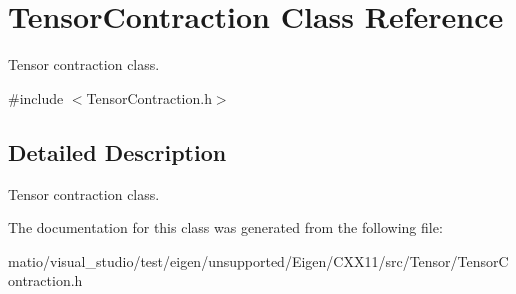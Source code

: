 \hypertarget{class_tensor_contraction}{}\section{Tensor\+Contraction Class Reference}
\label{class_tensor_contraction}


Tensor contraction class.  




{\ttfamily \#include $<$Tensor\+Contraction.\+h$>$}



\subsection{Detailed Description}
Tensor contraction class. 

The documentation for this class was generated from the following file\+:\begin{DoxyCompactItemize}
\item 
matio/visual\+\_\+studio/test/eigen/unsupported/\+Eigen/\+C\+X\+X11/src/\+Tensor/\+Tensor\+Contraction.\+h\end{DoxyCompactItemize}
